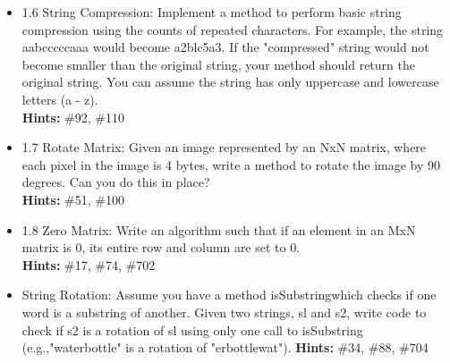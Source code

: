 \documentclass[14pt]{extarticle}
\begin{document}
\begin{itemize}
\item 1.6 String Compression: Implement a method to perform basic string compression
using the counts of repeated characters. For example, the string aabcccccaaa would
become a2blc5a3. If the "compressed" string would not become smaller than the original
string, your method should return the original string. You can assume the string has
only uppercase and lowercase letters (a - z).\\
\textbf{Hints:} \#92, \#110

\item 1.7 Rotate Matrix: Given an image represented by an NxN matrix, where each pixel in the
image is 4 bytes, write a method to rotate the image by 90 degrees. Can you do this in place?\\
\textbf{Hints:} \#51, \#100

\item 1.8 Zero Matrix: Write an algorithm such that if an element in an
MxN matrix is 0, its entire row and column are set to 0.\\
\textbf{Hints:} \#17, \#74, \#702

\item String Rotation: Assume you have a method isSubstringwhich checks if one word is a
substring of another. Given two strings, sl and s2, write code to check if s2 is a rotation
of sl using only one call to isSubstring (e.g.,"waterbottle" is a rotation of "erbottlewat").
\textbf{Hints:} \#34, \#88, \#704

\end{itemize}
\end{document}
